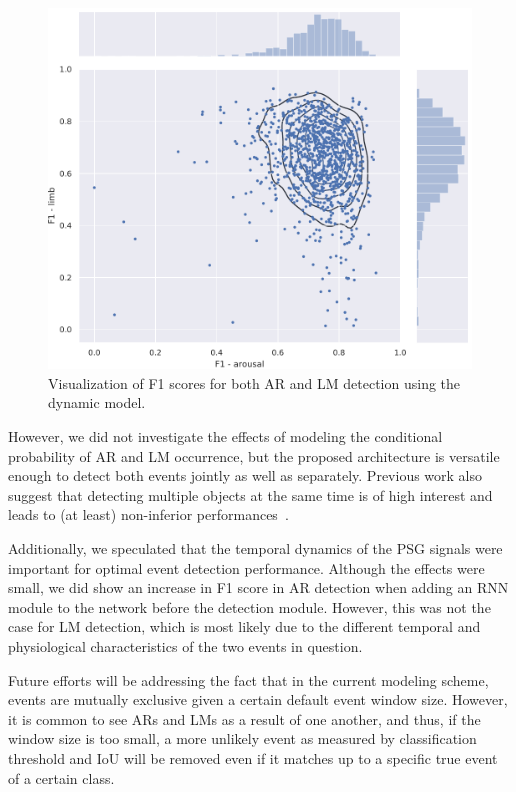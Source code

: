\begin{figure}[tb]
    \centering
    \includegraphics[width=\columnwidth]{figures/paper-iv/embc19-distribution.pdf}
    \caption[MSEDv1 visualization of F1 scores]{Visualization of F1 scores for both AR and LM detection using the dynamic model.}
    \label{fig:paperiv-test_distribution}
\end{figure}
However, we did not investigate the effects of modeling the conditional probability of AR and LM occurrence, but the proposed architecture is versatile enough to detect both events jointly as well as separately. Previous work also suggest that detecting multiple objects at the same time is of high interest and leads to (at least) non-inferior performances~\cite{Chambon2018b, Chambon2019, Redmon2016, Liu2016b}.

Additionally, we speculated that the temporal dynamics of the \ac{PSG} signals were important for optimal event detection performance. Although the effects were small, we did show an increase in F1 score in AR detection when adding an RNN module to the network before the detection module. However, this was not the case for LM detection, which is most likely due to the different temporal and physiological characteristics of the two events in question. 

Future efforts will be addressing the fact that in the current modeling scheme, events are mutually exclusive given a certain default event window size. However, it is common to see ARs and LMs as a result of one another, and thus, if the window size is too small, a more unlikely event as measured by classification threshold and IoU will be removed even if it matches up to a specific true event of a certain class. 